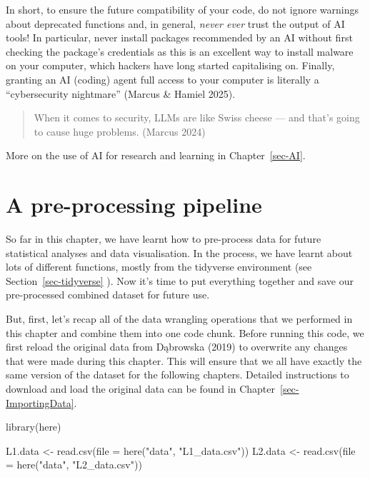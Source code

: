 \documentclass[
  letterpaper,
  DIV=11,
  numbers=noendperiod]{scrreprt}
\newenvironment{Shaded}{\begin{snugshade}}{\end{snugshade}}
\newcommand{\AttributeTok}[1]{\textcolor[rgb]{0.40,0.45,0.13}{#1}}
\newcommand{\FunctionTok}[1]{\textcolor[rgb]{0.28,0.35,0.67}{#1}}
\newcommand{\NormalTok}[1]{\textcolor[rgb]{0.00,0.23,0.31}{#1}}
\newcommand{\OtherTok}[1]{\textcolor[rgb]{0.00,0.23,0.31}{#1}}
\newcommand{\StringTok}[1]{\textcolor[rgb]{0.13,0.47,0.30}{#1}}
\begin{document}
\begin{tcolorbox}
\begin{figure}[H]
\end{figure}%

In short, to ensure the future compatibility of your code, do not ignore
warnings about deprecated functions and, in general, \emph{never ever}
trust the output of AI tools! In particular, never install packages
recommended by an AI without first checking the package's credentials as
this is an excellent way to install malware on your computer, which
hackers have long started capitalising on. Finally, granting an AI
(coding) agent full access to your computer is literally a
``cybersecurity nightmare'' (Marcus \& Hamiel 2025).

\begin{quote}
When it comes to security, LLMs are like Swiss cheese --- and that's
going to cause huge problems. (Marcus 2024)
\end{quote}

More on the use of AI for research and learning in Chapter~\ref{sec-AI}.

\end{tcolorbox}

\section{A pre-processing pipeline}\label{sec-filter}

So far in this chapter, we have learnt how to pre-process data for
future statistical analyses and data visualisation. In the process, we
have learnt about lots of different functions, mostly from the tidyverse
environment (see Section~\ref{sec-tidyverse} ). Now
it's time to put everything together and save our pre-processed combined
dataset for future use.

But, first, let's recap all of the data wrangling operations that we
performed in this chapter and combine them into one code chunk. Before
running this code, we first reload the original data from Dąbrowska
(2019) to overwrite any changes that were made during this chapter. This
will ensure that we all have exactly the same version of the dataset for
the following chapters. Detailed instructions to download and load the
original data can be found in Chapter~\ref{sec-ImportingData}.

\begin{Shaded}
\begin{Highlighting}[]
\FunctionTok{library}\NormalTok{(here)}

\NormalTok{L1.data }\OtherTok{\textless{}{-}} \FunctionTok{read.csv}\NormalTok{(}\AttributeTok{file =} \FunctionTok{here}\NormalTok{(}\StringTok{"data"}\NormalTok{, }\StringTok{"L1\_data.csv"}\NormalTok{))}
\NormalTok{L2.data }\OtherTok{\textless{}{-}} \FunctionTok{read.csv}\NormalTok{(}\AttributeTok{file =} \FunctionTok{here}\NormalTok{(}\StringTok{"data"}\NormalTok{, }\StringTok{"L2\_data.csv"}\NormalTok{))}
\end{Highlighting}
\end{Shaded}
\end{document}
